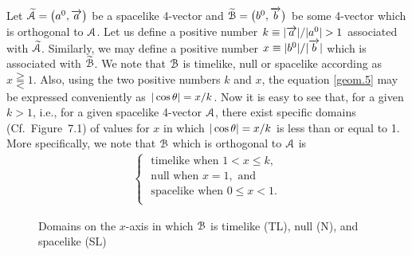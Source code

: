 \prf  Let $\EuScript{\tilde{A}}=\big(a^0, 
\veca{a}\big)$ be a spacelike 4-vector and 
$\EuScript{\tilde{B}} =\big(b^0, \veca{b}\big)$ be some 
4-vector which is orthogonal to $\EuScript{A}$. 
Let us define a positive number $k\equiv |\veca{a}| 
/|a^0| >1$ associated with 
$\EuScript{\tilde{A}}$. Similarly, we may define a 
positive number $x\equiv |b^0|/|\veca{b}|$ which is 
associated with $\EuScript{\tilde{B}}$. We note that 
$\EuScript{B}$ is timelike, null or spacelike according 
as $x\gtreqqless 1$. Also,  using the two positive 
numbers  $k$ and $x$, the equation \eqref{geom.5} may 
be expressed conveniently as $|\cos\gkq|=x/k$. Now it 
is easy to see that, for a given $k>1$, i.e., for a 
given spacelike 4-vector $\EuScript{A}$, there exist 
specific domains (Cf.~Figure~7.1) of values for $x$ in 
which $|\cos\gkq|=x/k$ is less than or equal to 1.  
More specifically, we note  that $\EuScript{B}$ which 
is orthogonal to $\EuScript{A}$ is
\begin{align*}
\begin{cases}
\text{ timelike when }     1<x\leq k,\\
\text{ null when }    x=1, \text{ and} \\
 \text{ spacelike when }    0\leq x<1.\\
\end{cases}
\end{align*}
\begin{figure}[H]
\begin{center}
\end{center}
\vse\caption{\small Domains on the $x$-axis in 
which $\EuScript{B}$ is timelike (TL), 
null (N), and spacelike (SL)}\label{fig7.1}
\end{figure}

